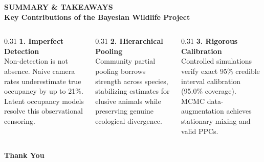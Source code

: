 \documentclass[aspectratio=169,10pt]{beamer}
\begin{document}
{
\begin{frame}[c,plain]
  \centering
  {\scriptsize \textbf{\color{accentcyan} SUMMARY \& TAKEAWAYS}}\\[0.12cm]
  {\Large \textbf{\color{white} Key Contributions of the Bayesian Wildlife Project}}\\[0.35cm]
  
  \begin{columns}[t,onlytextwidth]
    \begin{column}{0.31\textwidth}
      \centering
      {\small \textbf{\color{accentcyan} 1. Imperfect Detection}}\\[0.08cm]
      {\scriptsize \color{white!85} Non-detection is not absence. Naive camera rates underestimate true occupancy by up to 21\%. Latent occupancy models resolve this observational censoring.}
    \end{column}
    
    \begin{column}{0.31\textwidth}
      \centering
      {\small \textbf{\color{accentcyan} 2. Hierarchical Pooling}}\\[0.08cm]
      {\scriptsize \color{white!85} Community partial pooling borrows strength across species, stabilizing estimates for elusive animals while preserving genuine ecological divergence.}
    \end{column}
    
    \begin{column}{0.31\textwidth}
      \centering
      {\small \textbf{\color{accentcyan} 3. Rigorous Calibration}}\\[0.08cm]
      {\scriptsize \color{white!85} Controlled simulations verify exact 95\% credible interval calibration (95.0\% coverage). MCMC data-augmentation achieves stationary mixing and valid PPCs.}
    \end{column}
  \end{columns}
  
  \vspace{0.35cm}
  \begin{center}
    \setlength{\fboxrule}{1pt}
  \end{center}
  
  \vspace{0.35cm}
  {\Large \textbf{\color{accentcyan} Thank You}}
\end{frame}
}
\end{document}
